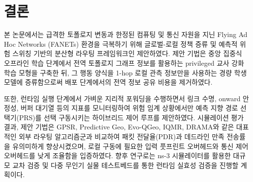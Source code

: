 \section{결론}
\label{sec:결론}

본 논문에서는 급격한 토폴로지 변동과 한정된 컴퓨팅 및 통신 자원을 지닌 Flying Ad Hoc Networks (FANETs) 환경을 극복하기 위해 글로벌-로컬 정책 증류 및 예측적 위험 스위칭 기반의 분산형 라우팅 프레임워크인  제안하였다. 제안 기법은 중앙 집중식 오프라인 학습 단계에서 전역 토폴로지 그래프 정보를 활용하는 privileged 교사 강화학습 모형을 구축한 뒤, 그 행동 양식을 1-hop 로컬 관측 정보만을 사용하는 경량 학생 모델에 증류함으로써 배포 단계에서의 전역 정보 공유 비용을 제거하였다. 

또한, 런타임 실행 단계에서 가벼운 지리적 포워딩을 수행하면서 링크 수명, onward 안정성, 버퍼 대기열 등의 지표를 모니터링하여 위험 임계 상황에서만 예측 지향 경로 선택기(PRS)를 선택 구동시키는 하이브리드 제어 루프를 제안하였다. 시뮬레이션 평가 결과, 제안 기법은 GPSR, Predictive Geo, Evo-QGeo, IQMR, DRAMA와 같은 대표적인 외부 라우팅 알고리즘군과 비교하여 패킷 전달율(PDR)과 데드라인 만족 전송률을 유의미하게 향상시켰으며, 로컬 구동에 필요한 입력 풋프린트 오버헤드와 통신 제어 오버헤드를 낮게 조율함을 입증하였다. 향후 연구로는 ns-3 시뮬레이터를 활용한 대규모 교차 검증 및 다중 무인기 실물 테스트베드를 통한 런타임 실효성 검증을 진행할 계획이다.

